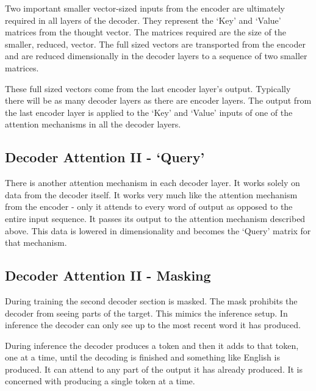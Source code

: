 Two important smaller vector-sized inputs from the encoder are ultimately required in all layers of the decoder. They represent the `Key' and `Value' matrices from the thought vector. The matrices required are the size of the smaller, reduced, vector. The full sized vectors are transported from the encoder and are reduced dimensionally in the decoder layers to a sequence of two smaller matrices. 

These full sized vectors come from the last encoder layer's output. Typically there will be as many decoder layers as there are encoder layers. The output from the last encoder layer is applied to the `Key' and `Value' inputs of one of the attention mechanisms in all the decoder layers.

\subsection{Decoder Attention II - `Query'}
There is another attention mechanism in each decoder layer. It works solely on data from the decoder itself. It works very much like the attention mechanism from the encoder - only it attends to every word of output as opposed to the entire input sequence. It passes its output to the attention mechanism described above. This data is lowered in dimensionality and becomes the `Query' matrix for that mechanism. 

\subsection{Decoder Attention II - Masking}

During training the second decoder section is masked. The mask prohibits the decoder from seeing parts of the target. This mimics the inference setup. In inference the decoder can only see up to the most recent word it has produced.

During inference the decoder produces a token and then it adds to that token, one at a time, until the decoding is finished and something like English is produced. It can attend to any part of the output it has already produced. It is concerned with producing a single token at a time.

